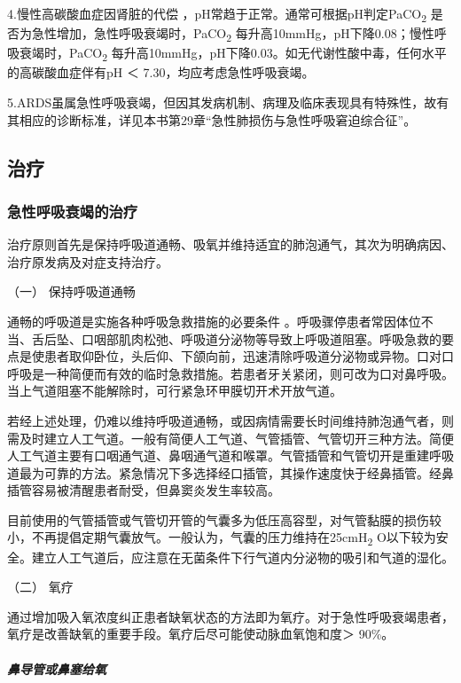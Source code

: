 4.慢性高碳酸血症因肾脏的代偿
，pH常趋于正常。通常可根据pH判定PaCO\textsubscript{2}
是否为急性增加，急性呼吸衰竭时，PaCO\textsubscript{2}
每升高10mmHg，pH下降0.08；慢性呼吸衰竭时，PaCO\textsubscript{2}
每升高10mmHg，pH下降0.03。如无代谢性酸中毒，任何水平的高碳酸血症伴有pH
＜ 7.30，均应考虑急性呼吸衰竭。

5.ARDS虽属急性呼吸衰竭，但因其发病机制、病理及临床表现具有特殊性，故有其相应的诊断标准，详见本书第29章“急性肺损伤与急性呼吸窘迫综合征”。

\subsection{治疗}

\subsubsection{急性呼吸衰竭的治疗}

治疗原则首先是保持呼吸道通畅、吸氧并维持适宜的肺泡通气，其次为明确病因、治疗原发病及对症支持治疗。

\hypertarget{text00076.htmlux5cux23CHP3-4-3-1-1}{}
（一） 保持呼吸道通畅

通畅的呼吸道是实施各种呼吸急救措施的必要条件
。呼吸骤停患者常因体位不当、舌后坠、口咽部肌肉松弛、呼吸道分泌物等导致上呼吸道阻塞。呼吸急救的要点是使患者取仰卧位，头后仰、下颌向前，迅速清除呼吸道分泌物或异物。口对口呼吸是一种简便而有效的临时急救措施。若患者牙关紧闭，则可改为口对鼻呼吸。当上气道阻塞不能解除时，可行紧急环甲膜切开术开放气道。

若经上述处理，仍难以维持呼吸道通畅，或因病情需要长时间维持肺泡通气者，则需及时建立人工气道。一般有简便人工气道、气管插管、气管切开三种方法。简便人工气道主要有口咽通气道、鼻咽通气道和喉罩。气管插管和气管切开是重建呼吸道最为可靠的方法。紧急情况下多选择经口插管，其操作速度快于经鼻插管。经鼻插管容易被清醒患者耐受，但鼻窦炎发生率较高。

目前使用的气管插管或气管切开管的气囊多为低压高容型，对气管黏膜的损伤较小，不再提倡定期气囊放气。一般认为，气囊的压力维持在25cmH\textsubscript{2}
O以下较为安全。建立人工气道后，应注意在无菌条件下行气道内分泌物的吸引和气道的湿化。

\hypertarget{text00076.htmlux5cux23CHP3-4-3-1-2}{}
（二） 氧疗

通过增加吸入氧浓度纠正患者缺氧状态的方法即为氧疗。对于急性呼吸衰竭患者，氧疗是改善缺氧的重要手段。氧疗后尽可能使动脉血氧饱和度＞
90\%。

\subparagraph{鼻导管或鼻塞给氧}

